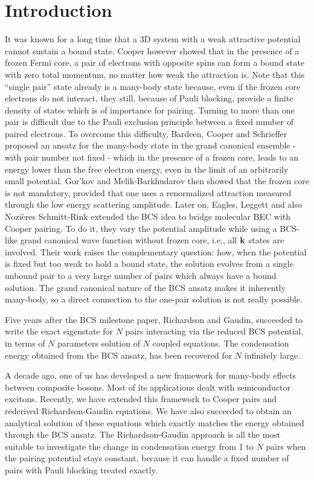 \documentclass[5p,twocolumn]{elsarticle}
\begin{document}
\section{Introduction}
It was known for a long time that a 3D system with a weak attractive potential cannot sustain a bound state.  Cooper however showed that in the presence of a frozen Fermi core, a pair of electrons with opposite spins can form a bound state with zero total momentum,  no matter how weak the attraction is\cite{Cooper}.  Note that this ``single pair'' state already is a many-body state because, even if the frozen core electrons do not interact, they still, because of  Pauli blocking, provide a finite density of states which is of importance for pairing. Turning to more than one pair is difficult due to the Pauli exclusion principle between a fixed number of paired electrons. To overcome this difficulty, Bardeen, Cooper and Schrieffer proposed an ansatz for the many-body state in the grand canonical ensemble - with  pair number not fixed - which in the presence of a frozen core, leads to an energy lower than the free electron energy, even in the limit of an arbitrarily small potential\cite{BCS}. Gor'kov and Melik-Barkhudarov then showed that the frozen core is not
  mandatory, provided that one uses a renormalized attraction measured through the low energy scattering amplitude\cite{Gorkov}.   Later on, Eagles\cite{Eagle}, Leggett\cite{LeggettCrossover} and also Nozi\`{e}res Schmitt-Rink\cite{Nozieres} extended the BCS  idea to bridge molecular BEC with Cooper pairing. To do it, they vary the potential amplitude while using a BCS-like grand canonical wave function without frozen core, i.e., all $\mathbf{k}$ states are involved.  Their work raises the complementary question: how, when the potential is fixed but too weak to hold a bound state, the solution evolves from a single unbound pair to a very large number of pairs which always have a bound solution. The grand canonical nature of the BCS ansatz makes it inherently many-body, so a direct connection to the one-pair solution is not really possible.  

Five years after the BCS milestone paper, Richardson\cite{Richardson1} and Gaudin\cite{gaudin}, succeeded to write the exact eigenstate for $N$  pairs interacting via the reduced BCS potential, in terms of $N$ parameters solution of $N$ coupled equations. The condensation energy obtained from the BCS ansatz, has been recovered for $N$ infinitely large\cite{Richardson2,Richardson3,Richardson1968}. 

A decade ago, one of us has developed a new framework\cite{CobosonPhysicsReports} for many-body effects between composite bosons. Most of its applications dealt with semiconductor excitons.   Recently, we have extended this framework to Cooper pairs and rederived Richardson-Gaudin equations\cite{CobosonBcsRich}. We have also succeeded to obtain an analytical solution of these equations \cite{moth,combescotBCS} which exactly matches the energy obtained through the BCS ansatz.  The Richardson-Gaudin approach is all the most suitable to investigate the change in condensation energy from 1 to $N$ pairs when the pairing potential stays constant, because it can handle a fixed number of pairs with Pauli blocking treated exactly.
\end{document}
